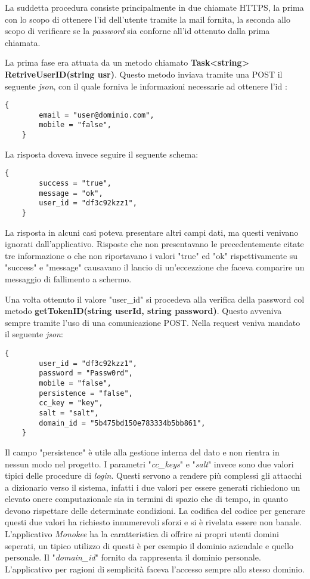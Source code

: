 La suddetta procedura consiste principalmente in due chiamate HTTPS, la prima con lo scopo di ottenere l'id dell'utente tramite la mail fornita, la seconda allo scopo di verificare se la \emph{password} sia conforne all'id ottenuto dalla prima chiamata. 

La prima fase era attuata da un metodo chiamato \textbf{Task<string> RetriveUserID(string usr)}. Questo metodo inviava tramite una POST il seguente \emph{json}, con il quale forniva le informazioni necessarie ad ottenere l'id :

\begin{lstlisting}[caption={Json della prima request di login}]
    {
        email = "user@dominio.com",
        mobile = "false",
    }
\end{lstlisting}

La risposta doveva invece seguire il seguente schema:

\begin{lstlisting}[caption={Json risposta user\_id}]
    {
        success = "true",
        message = "ok",
        user_id = "df3c92kzz1",
    }
\end{lstlisting}

La risposta in alcuni casi poteva presentare altri campi dati, ma questi venivano ignorati dall'applicativo. Risposte che non presentavano le precedentemente citate tre informazione o che non riportavano i valori "true" ed "ok" rispettivamente su "success" e "message" causavano il lancio di un'eccezzione che faceva comparire un messaggio di fallimento a schermo.

Una volta ottenuto il valore "user\_id" si procedeva alla verifica della password col metodo
\textbf{getTokenID(string userId, string password)}.
Questo avveniva sempre tramite l'uso di una comunicazione POST. Nella request veniva mandato il seguente \emph{json}:

\begin{lstlisting}[caption={Json richiesta token}]
    {
        user_id = "df3c92kzz1",
        password = "Passw0rd",
        mobile = "false",
        persistence = "false",
        cc_key = "key",
        salt = "salt",
        domain_id = "5b475bd150e783334b5bb861",
    }
\end{lstlisting}

Il campo "persistence" è utile alla gestione interna del dato e non rientra in nessun modo nel progetto.
I parametri "\emph{cc\_keys}" e "\emph{salt}" invece sono due valori tipici delle procedure di \emph{login}. Questi servono a rendere più complessi gli attacchi a dizionario verso il sistema, infatti i due valori per essere generati richiedono un elevato onere computazionale sia in termini di spazio che di tempo, in quanto devono rispettare delle determinate condizioni. La codifica del codice per generare questi due valori ha richiesto innumerevoli sforzi e si è rivelata essere non banale.
L'applicativo \emph{Monokee} ha la caratteristica di offrire ai propri utenti domini seperati, un tipico utilizzo di questi è per esempio il dominio aziendale e quello personale. Il "\emph{domain\_id}" fornito da rappresenta il dominio personale. L'applicativo per ragioni di semplicità faceva l'accesso sempre allo stesso dominio. 


